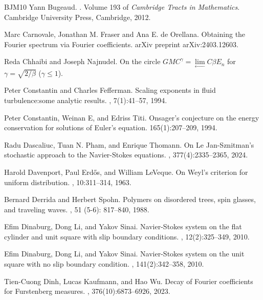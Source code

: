 \documentclass[12pt]{amsart}
\theoremstyle{definition}
\theoremstyle{remark}
\numberwithin{equation}{section}
\begin{document}
\begin{thebibliography}{BJM10}
	Yann Bugeaud.
	. Volume
	193 of {\em Cambridge Tracts in Mathematics}.
	\newblock Cambridge University Press, Cambridge, 2012.
	
	
	Marc Carnovale, Jonathan M. Fraser and Ana E. de Orellana. 
	\newblock  Obtaining the Fourier spectrum via Fourier coefficients. arXiv preprint arXiv:2403.12603.
	
	Reda Chhaibi and Joseph Najnudel. 
	\newblock On the circle $GMC^\gamma=\lim\limits_{\longleftarrow} C\beta E_n$ for $\gamma=\sqrt{2/\beta}$ ($\gamma\leq 1$).
	
	Peter Constantin and Charles Fefferman.
	\newblock Scaling exponents in fluid turbulence:some analytic results.
	, 7(1):41--57, 1994.
	
	
	Peter Constantin, Weinan E, and Edriss Titi. 
	\newblock Onsager’s conjecture on the energy conservation for solutions of Euler’s equation.
	 165(1):207–209, 1994.
	
	
	Radu Dascaliuc, Tuan N. Pham, and Enrique Thomann.
	\newblock On {L}e {J}an-{S}znitman's stochastic approach to the
	{N}avier-{S}tokes equations.
	, 377(4):2335--2365, 2024.
	
	Harold Davenport, Paul Erd\H{o}s, and William LeVeque.
	\newblock On {W}eyl's criterion for uniform distribution.
	, 10:311--314, 1963.
	
	Bernard Derrida and Herbert Spohn.
	\newblock Polymers on disordered trees, spin glasses, and traveling   waves. 
	,  51 (5-6): 817--840, 1988. 
	
	
	
	Efim Dinaburg, Dong Li, and Yakov Sinai.
	\newblock Navier-{S}tokes system on the flat cylinder and unit square with slip
	boundary conditions.
	, 12(2):325--349, 2010.
	
	Efim Dinaburg, Dong Li, and Yakov Sinai.
	\newblock Navier-{S}tokes system on the unit square with no slip boundary
	condition.
	, 141(2):342--358, 2010.
	
	Tien-Cuong Dinh, Lucas Kaufmann, and Hao Wu.
	\newblock Decay of {F}ourier coefficients for {F}urstenberg measures.
	, 376(10):6873--6926, 2023.
	

\end{thebibliography}
\end{document}
